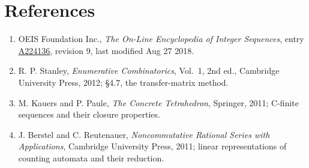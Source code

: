 \documentclass[11pt]{article}
\theoremstyle{definition}
\begin{document}
\section{References}

\begin{enumerate}

\item OEIS Foundation Inc., \emph{The On-Line Encyclopedia of Integer Sequences}, entry \href{https://oeis.org/A224136}{A224136}, revision 9, last modified Aug 27 2018.

\item R. P. Stanley, \emph{Enumerative Combinatorics}, Vol.~1, 2nd ed., Cambridge University Press, 2012; \S4.7, the transfer-matrix method.

\item M. Kauers and P. Paule, \emph{The Concrete Tetrahedron}, Springer, 2011; C-finite sequences and their closure properties.

\item J. Berstel and C. Reutenauer, \emph{Noncommutative Rational Series with Applications}, Cambridge University Press, 2011; linear representations of counting automata and their reduction.

\end{enumerate}
\end{document}
